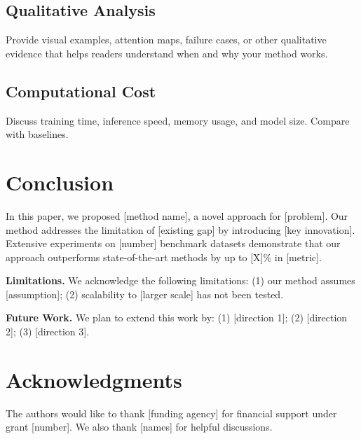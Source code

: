 \documentclass[conference,10pt]{IEEEtran}
\begin{document}
\subsection{Qualitative Analysis}
\label{subsec:qualitative}
Provide visual examples, attention maps, failure cases, or other
qualitative evidence that helps readers understand when and why
your method works.

\subsection{Computational Cost}
\label{subsec:computational}
Discuss training time, inference speed, memory usage, and model size.
Compare with baselines.

\section{Conclusion}
\label{sec:conclusion}

In this paper, we proposed [method name], a novel approach for [problem].
Our method addresses the limitation of [existing gap] by introducing
[key innovation]. Extensive experiments on [number] benchmark datasets
demonstrate that our approach outperforms state-of-the-art methods by
up to [X]\% in [metric].

\textbf{Limitations.} We acknowledge the following limitations:
(1) our method assumes [assumption]; (2) scalability to
[larger scale] has not been tested.

\textbf{Future Work.} We plan to extend this work by:
(1) [direction 1]; (2) [direction 2]; (3) [direction 3].

\section*{Acknowledgments}
The authors would like to thank [funding agency] for financial support
under grant [number]. We also thank [names] for helpful discussions.
\end{document}
